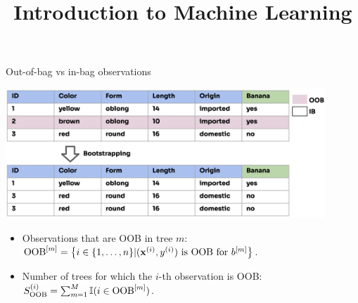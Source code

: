\documentclass[11pt,compress,t,notes=noshow,xcolor=table]{beamer}
\title{Introduction to Machine Learning}
\institute{\href{https://compstat-lmu.github.io/lecture_i2ml/}{compstat-lmu.github.io/lecture\_i2ml}}
\date{}
\begin{document}
\sloppy


\begin{vbframe}{Out-of-bag vs in-bag observations}
  
\begin{center}
\includegraphics[width=0.9\textwidth]{figure_man/forest-oob.png}
\end{center}

\begin{itemize}
  \item Observations that are OOB in tree $m$: $\text{OOB}^{[m]} = \left \{i \in \{1, \ldots, n\} | (\mathbf{x}^{(i)}, y^{(i)}) \text{ is OOB for } b^{[m]} \right \}$.
  \item Number of trees for which the $i$-th observation is OOB: $S_{\text{OOB}}^{(i)} = \sum_{m = 1}^M \mathbb{I}(i \in \text{OOB}^{[m]})$.
\end{itemize}

\end{vbframe}
\end{document}
